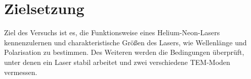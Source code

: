 \section{Zielsetzung}
\label{sec:zielsetzung}

Ziel des Versuchs ist es, die Funktionsweise eines Helium-Neon-Lasers
kennenzulernen und charakteristische Größen des Lasers, wie Wellenlänge und
Polarisation zu bestimmen. Des Weiteren werden die Bedingungen überprüft, unter
denen ein Laser stabil arbeitet und zwei verschiedene TEM-Moden vermessen.
